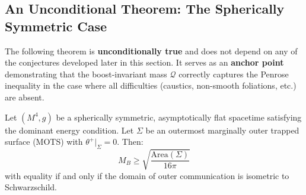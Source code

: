 
\subsection{An Unconditional Theorem: The Spherically Symmetric Case}
\label{subsec:spherical-anchor}

\begin{remark}
The following theorem is \textbf{unconditionally true} and does not depend on any of the conjectures developed later in this section. It serves as an \textbf{anchor point} demonstrating that the boost-invariant mass $\mathcal{Q}$ correctly captures the Penrose inequality in the case where all difficulties (caustics, non-smooth foliations, etc.) are absent.
\end{remark}

\begin{theorem}
\label{thm:spherical-penrose-unconditional}
Let $(M^4, g)$ be a spherically symmetric, asymptotically flat spacetime satisfying the dominant energy condition. Let $\Sigma$ be an outermost marginally outer trapped surface (MOTS) with $\theta^+|_\Sigma = 0$. Then:
\begin{equation}
\boxed{M_B \geq \sqrt{\frac{\mathrm{Area}(\Sigma)}{16\pi}}}
\end{equation}
with equality if and only if the domain of outer communication is isometric to Schwarzschild.
\end{theorem}

